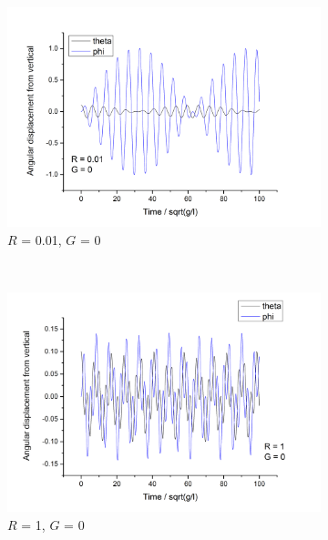\documentclass[11pt]{article}
\begin{document}
\begin{figure}[h!] \label{fig:dp_motion_G0}
  \centering
  \begin{subfigure}[h]{0.5\textwidth}
    \includegraphics[width=\textwidth]{img/dp/R=0-01_G=0.png}
    \captionsetup{width=0.85\textwidth}
    \caption{$R$ = 0.01, $G$ = 0}
    \label{fig:dp_R0.01_G0}
  \end{subfigure}%
  ~ %
  \begin{subfigure}[h]{0.5\textwidth}
    \includegraphics[width=\textwidth]{img/dp/R=1_G=0.png}
    \captionsetup{width=0.85\textwidth}
    \caption{$R$ = 1, $G$ = 0}
    \label{fig:dp_R1_G0}
  \end{subfigure}
  ~ %
  \begin{subfigure}[h]{0.5\textwidth}

\end{subfigure}
\end{figure}
\end{document}
